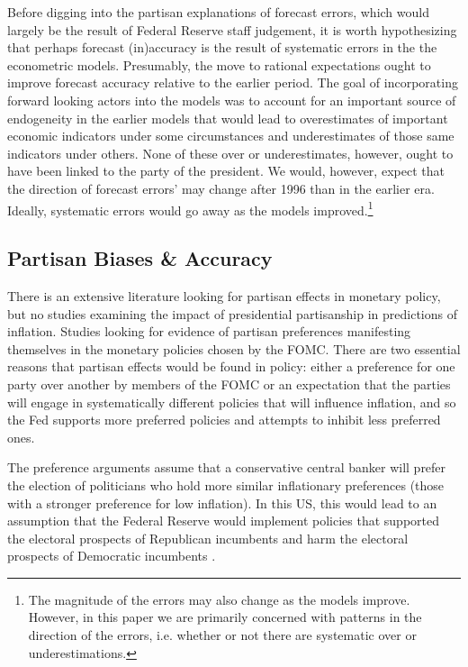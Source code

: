 \documentclass[a4paper]{article}\usepackage{graphicx, color}
\begin{document}
Before digging into the partisan explanations of forecast errors, which would largely be the result of Federal Reserve staff judgement, it is worth hypothesizing that perhaps forecast (in)accuracy is the result of systematic errors in the the econometric models. Presumably, the move to rational expectations ought to improve forecast accuracy relative to the earlier period. The goal of incorporating forward looking actors into the models was to account for an important source of endogeneity in the earlier models that would lead to overestimates of important economic indicators under some circumstances and underestimates of those same indicators under others. None of these over or underestimates, however, ought to have been linked to the party of the president. We would, however, expect that the direction of forecast errors' may change after 1996 than in the earlier era. Ideally, systematic errors would go away as the models improved.\footnote{The magnitude of the errors may also change as the models improve. However, in this paper we are primarily concerned with patterns in the direction of the errors, i.e. whether or not there are systematic over or underestimations.}


\subsection{Partisan Biases \& Accuracy}

There is an extensive literature looking for partisan effects in monetary policy, but no studies examining the impact of presidential partisanship in predictions of inflation. Studies looking for evidence of partisan preferences manifesting themselves in the monetary policies chosen by the FOMC. There are two essential reasons that partisan effects would be found in policy: either a preference for one party over another by members of the FOMC or an expectation that the parties will engage in systematically different policies that will influence inflation, and so the Fed supports more preferred policies and attempts to inhibit less preferred ones. 

The preference arguments assume that a conservative central banker will prefer the election of politicians who hold more similar inflationary preferences (those with a stronger preference for low inflation). In this US, this would lead to an assumption that the Federal Reserve would implement policies that supported the electoral prospects of Republican incumbents and harm the electoral prospects of Democratic incumbents \citep{Clark2011,Hakes1988,Sieg1997,Tootell1996}.
\end{document}
